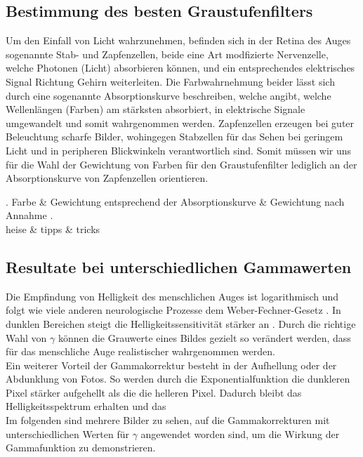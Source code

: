 \documentclass[course=erap]{aspdoc}
\begin{document}
\subsection{Bestimmung des besten Graustufenfilters}
Um den Einfall von Licht wahrzunehmen, befinden sich in der Retina des Auges sogenannte Stab- und Zapfenzellen, beide eine Art modfizierte Nervenzelle, welche Photonen (Licht) absorbieren können, und ein entsprechendes elektrisches Signal Richtung Gehirn weiterleiten.
Die Farbwahrnehmung beider lässt sich durch eine sogenannte Absorptionskurve beschreiben, welche angibt, welche Wellenlängen (Farben) am stärksten absorbiert, in elektrische Signale umgewandelt und somit wahrgenommen werden.
Zapfenzellen erzeugen bei guter Beleuchtung scharfe Bilder, wohingegen Stabzellen für das Sehen bei geringem Licht und in peripheren Blickwinkeln verantwortlich sind. Somit müssen wir uns für die Wahl der Gewichtung von Farben für den Graustufenfilter lediglich an der Absorptionskurve von Zapfenzellen orientieren.
\begin{tabular}
.		Farbe & Gewichtung entsprechend der Absorptionskurve & Gewichtung nach Annahme . \\
	heise & tipps & tricks \\
\end{tabular}

\subsection{Resultate bei unterschiedlichen Gammawerten}
Die Empfindung von Helligkeit des menschlichen Auges ist logarithmisch und folgt wie viele anderen neurologische Prozesse dem Weber-Fechner-Gesetz \cite{weberFechnerGesetz}. In dunklen Bereichen steigt die Helligkeitssensitivität stärker an \cite{Logarithmische_Helligkeitswahrnehmung}. Durch die richtige Wahl von $\gamma$ können die Grauwerte eines Bildes gezielt so verändert werden, dass für das menschliche Auge realistischer wahrgenommen werden. 
\\
\newline
Ein weiterer Vorteil der Gammakorrektur besteht in der Aufhellung oder der Abdunklung von Fotos. So werden durch die Exponentialfunktion die dunkleren Pixel stärker aufgehellt als die die helleren Pixel. \cite{gammKorrekturWikipedia}
Dadurch bleibt das Helligkeitsspektrum erhalten und das %
\\
\newline
Im folgenden sind mehrere Bilder zu sehen, auf die Gammakorrekturen mit unterschiedlichen Werten für $\gamma$ angewendet worden sind, um die Wirkung der Gammafunktion zu demonstrieren.    
\end{document}
